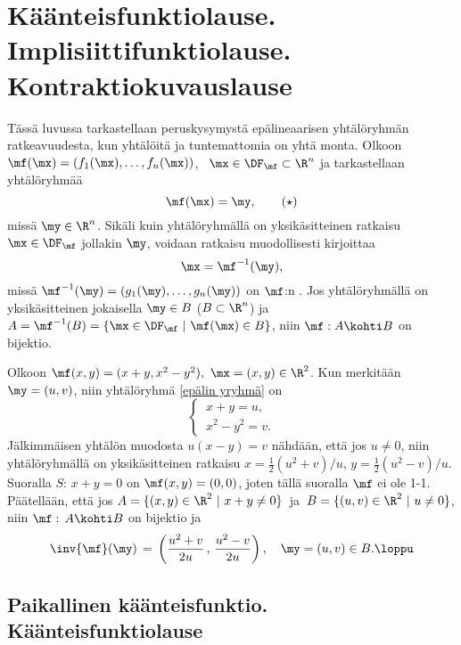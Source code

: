 \section[Käänteisfunktiolause. Implisiittifunktiolause. \\ Kontraktiokuvauslause]
{Käänteisfunktiolause. Implisiittifunktiolause. \\ Kontraktiokuvauslause}
\label{käänteisfunktiolause} 
\alku

Tässä luvussa tarkastellaan peruskysymystä epälineaarisen yhtälöryhmän ratkeavuudesta, kun 
yhtälöitä ja tuntemattomia on yhtä monta. Olkoon $\mf(\mx)=(f_1(\mx),\ldots,f_n(\mx))$, \
$\mx\in\DF_\mf\subset\R^n$ ja tarkastellaan yhtälöryhmää
\begin{equation} \label{epälin yryhmä}
\mf(\mx)=\my, \tag{$\star$}
\end{equation}
missä $\my\in\R^n$. Sikäli kuin yhtälöryhmällä on yksikäsitteinen ratkaisu $\mx\in\DF_\mf$
jollakin $\my$, voidaan ratkaisu muodollisesti kirjoittaa
\[
\mx = \mf^{-1}(\my),
\]
missä $\mf^{-1}(\my)=(g_1(\my),\ldots,g_n(\my))$ on $\mf$:n . Jos
yhtälöryhmällä on yksikäsitteinen jokaisella $\my \in B$ ($B\subset\R^n$) ja
$A=\mf^{-1}(B)=\{\mx\in\DF_\mf\ | \ \mf(\mx) \in B\}$, niin $\mf: A \kohti B$ on bijektio.
\begin{Exa} \label{udif-7: esim 1} Olkoon $\mf(x,y)=(x+y,x^2-y^2),\ \mx=(x,y)\in\R^2$. Kun
merkitään $\my=(u,v)$, niin yhtälöryhmä \eqref{epälin yryhmä} on
\[
\begin{cases} \,x+y =u, \\ \,x^2-y^2 =v. \end{cases}
\]
Jälkimmäisen yhtälön muodosta $u(x-y)=v$ nähdään, että jos $u \neq 0$, niin yhtälöryhmällä on
yksikäsitteinen ratkaisu $x=\frac{1}{2}(u^2+v)/u$, $y=\frac{1}{2}(u^2-v)/u$. Suoralla
$S:\,x+y=0$ on $\mf(x,y)=(0,0)$, joten tällä suoralla $\mf$ ei ole 1-1. Päätellään, että jos
$A=\{(x,y)\in\R^2\ | \ x+y \neq 0\}\,$ ja $\,B=\{(u,v)\in\R^2\ |\ u \neq 0\}$, niin
$\mf:\,A \kohti B$ on bijektio ja
\[
\inv{\mf}(\my) \,=\, \left(\frac{u^2+v}{2u}\,,\,\frac{u^2-v}{2u}\right), \quad 
                     \my = (u,v) \in B. \loppu
\]
\end{Exa}

\subsection*{Paikallinen käänteisfunktio. Käänteisfunktiolause}

